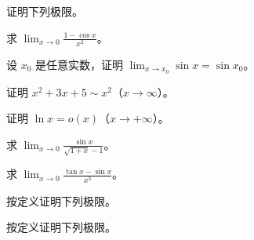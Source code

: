 \noindent\begin{minipage}{\textwidth}
证明下列极限。
\end{minipage}\par\vfill
\noindent\begin{minipage}{\textwidth}
求 $\displaystyle\lim_{x\to0}\frac{1-\cos x}{x^2}$。
\end{minipage}\par\vfill
\newpage
\noindent\begin{minipage}{\textwidth}
设 $x_0$ 是任意实数，证明 $\displaystyle\lim_{x\to x_0}\sin x=\sin x_0$。
\end{minipage}\par\vfill
\noindent\begin{minipage}{\textwidth}
证明 $x^2+3x+5\sim x^2$（$x\to\infty$）。
\end{minipage}\par\vfill
\noindent\begin{minipage}{\textwidth}
证明 $\ln x=o(x)$（$x\to+\infty$）。
\end{minipage}\par\vfill
\noindent\begin{minipage}{\textwidth}
求 $\displaystyle\lim_{x\to0}\frac{\sin x}{\sqrt{1+x}-1}$。
\end{minipage}\par\vfill
\newpage
\noindent\begin{minipage}{\textwidth}
求 $\displaystyle\lim_{x\to0}\frac{\tan x-\sin x}{x^3}$。
\end{minipage}\par\vfill
\noindent\begin{minipage}{\textwidth}
按定义证明下列极限。
\end{minipage}\par\vfill
\noindent\begin{minipage}{\textwidth}
按定义证明下列极限。
\end{minipage}\par\vfill
